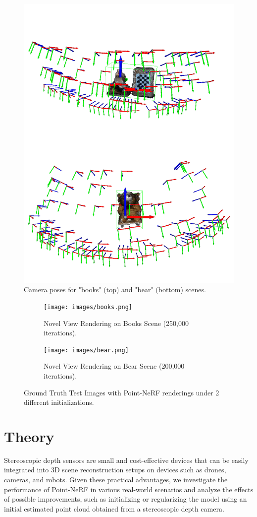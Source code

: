 \documentclass[10pt,twocolumn,letterpaper]{article}
\begin{document}
\begin{figure}[t]
  \centering
  \includegraphics[width=0.8\linewidth]{images/cams.png}
  \caption{Camera poses for "books" (top) and "bear" (bottom) scenes.}
   \label{fig:cams}
\end{figure}




\begin{figure}[ht!]
  \centering
  \begin{subfigure}{\linewidth}
    \centering
    \texttt{[image: images/books.png]}
    \caption{Novel View Rendering on Books Scene (250,000 iterations).}
  \end{subfigure}
  
  \begin{subfigure}{\linewidth}
    \centering
    \texttt{[image: images/bear.png]}
    \caption{Novel View Rendering on Bear Scene (200,000 iterations).}
  \end{subfigure}
  \caption{Ground Truth Test Images with Point-NeRF renderings under 2 different initializations.}
  \label{fig:test}
\end{figure}
\section{Theory}
\label{sec:overview}
Stereoscopic depth sensors are small and cost-effective devices that can be easily integrated into 3D scene reconstruction setups on devices such as drones, cameras, and robots. Given these practical advantages, we investigate the performance of Point-NeRF in various real-world scenarios and analyze the effects of possible improvements, such as initializing or regularizing the model using an initial estimated point cloud obtained from a stereoscopic depth camera.
\end{document}
